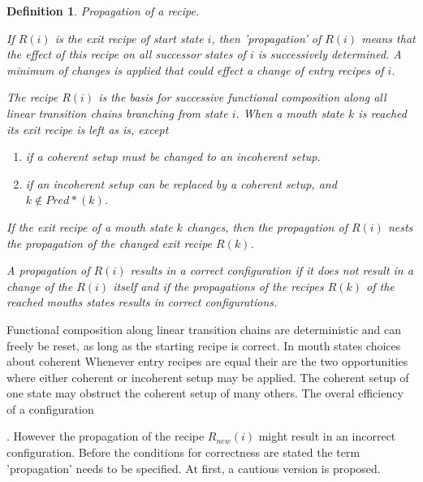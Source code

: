 \documentclass[12pt,a4paper]{scrartcl}
\newtheorem{definition}{Definition}
\begin{document}
\begin{definition} Propagation of a recipe.
    
    If $R(i)$ is the exit recipe of start state $i$, then 'propagation'
    of $R(i)$ means that the effect of this recipe on all successor states of
    $i$ is successively determined. A minimum of changes is applied that could
    effect a change of entry recipes of $i$.

    The recipe $R(i)$ is the basis for successive functional composition along
    all linear transition chains branching from state $i$. When a mouth state
    $k$ is reached its exit recipe is left as is, except 

    \begin{enumerate}
       \item if a coherent setup must be changed to an incoherent setup.
       \item if an incoherent setup can be replaced by a coherent setup, 
             and $k\notin Pred*(k)$.
    \end{enumerate}
    
    If the exit recipe of a  mouth state $k$ changes, then the propagation of
    $R(i)$ nests the propagation of the changed exit recipe $R(k)$. 

    A propagation of $R(i)$ results in a correct configuration if it does not
    result in a change of the $R(i)$ itself and if the propagations of the
    recipes $R(k)$ of the reached mouths states results in correct
    configurations.

\end{definition}

Functional composition along linear transition chains are deterministic
and can freely be reset, as long as the starting recipe is correct. 
In mouth states choices about coherent 
Whenever entry recipes are equal their are the two opportunities where
either coherent or incoherent setup may be applied. The coherent setup of
one state may obstruct the coherent setup of many others. The overal 
efficiency of a configuration 


.  However the propagation of the
recipe $R_{new}(i)$ might result in an incorrect configuration.  Before the
conditions for correctness are stated the term 'propagation' needs to be
specified. At first, a cautious version is proposed.
\end{document}
